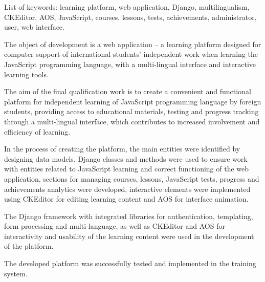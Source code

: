 List of keywords: learning platform, web application, Django, multilingualism, CKEditor, AOS, JavaScript, courses, lessons, tests, achievements, administrator, user, web interface.

The object of development is a web application -- a learning platform designed for computer support of international students' independent work when learning the JavaScript programming language, with a multi-lingual interface and interactive learning tools.

The aim of the final qualification work is to create a convenient and functional platform for independent learning of JavaScript programming language by foreign students, providing access to educational materials, testing and progress tracking through a multi-lingual interface, which contributes to increased involvement and efficiency of learning.

In the process of creating the platform, the main entities were identified by designing data models, Django classes and methods were used to ensure work with entities related to JavaScript learning and correct functioning of the web application, sections for managing courses, lessons, JavaScript tests, progress and achievements analytics were developed, interactive elements were implemented using CKEditor for editing learning content and AOS for interface animation.

The Django framework with integrated libraries for authentication, templating, form processing and multi-language, as well as CKEditor and AOS for interactivity and usability of the learning content were used in the development of the platform.

The developed platform was successfully tested and implemented in the training system.
